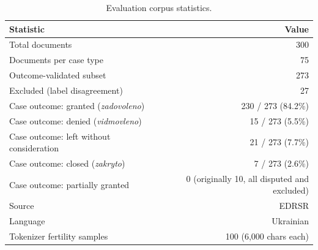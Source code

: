 \documentclass[11pt,a4paper]{article}
\begin{document}
\begin{table}[h]
\centering
\caption{Evaluation corpus statistics.}
\label{tab:dataset_stats}
\begin{tabular}{lr}
\toprule
\textbf{Statistic} & \textbf{Value} \\
\midrule
Total documents & 300 \\
Documents per case type & 75 \\
Outcome-validated subset & 273 \\
Excluded (label disagreement) & 27 \\
Case outcome: granted (\textit{zadovoleno}) & 230 / 273 (84.2\%) \\
Case outcome: denied (\textit{vidmovleno}) & 15 / 273 (5.5\%) \\
Case outcome: left without consideration & 21 / 273 (7.7\%) \\
Case outcome: closed (\textit{zakryto}) & 7 / 273 (2.6\%) \\
Case outcome: partially granted & 0 (originally 10, all disputed and excluded) \\
Source & EDRSR \\
Language & Ukrainian \\
Tokenizer fertility samples & 100 (6,000 chars each) \\
\bottomrule
\end{tabular}
\end{table}
\end{document}

